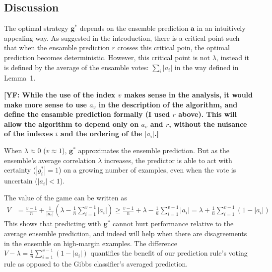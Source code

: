 \documentclass{article}[12pt]
\newcommand{\yoav}[1]{{\bf [YF: #1]}}
\theoremstyle{named}
\newcommand{\va}{\mathbf{a}}
\newcommand{\vg}{\mathbf{g}}    %
\newcommand{\vp}{\mathbf{p}}
\newcommand{\abs}[1]{\left| #1 \right|}
\newcommand{\lrp}[1]{\left(#1\right)}
\begin{document}


\subsection{Discussion}
\label{sec:1gamediscuss}

The optimal strategy $\vg^*$ depends on the ensemble prediction $\va$
in an intuitively appealing way. As suggested in the introduction,
there is a critical point such that when the ensamble prediction $r$
crosses this critical poin, the optimal prediction becomes
deterministic. However, this critical point is not $\lambda$, instead
it is defined by the average of the ensamble votes: $\sum_i |a_i|$ in
the way defined in Lemma~1.

\yoav{While the use of the index $v$ makes sense in the analysis, it
  would make more sense to use $a_v$ in the description of the
  algorithm, and define the ensamble prediction formally (I used $r$
  above). This will allow the algorithm to depend only on $a_v$ and
  $r$, without the nuisance of the indexes $i$ and the ordering of the
$|a_i|$.}

When $\lambda \approx 0$ ($v \approx 1$), $\vg^*$ approximates the ensemble prediction.  
But as the ensemble's average correlation $\lambda$ increases, 
the predictor is able to act with certainty ($\abs{g_i^*} = 1$) 
on a growing number of examples, 
even when the vote is uncertain ($\abs{a_i} < 1$). 

The value of the game can be written as 
\begin{align}
\label{valtbound}
V &= \frac{v-1}{n} + \frac{1}{\abs{a_v}} \lrp{ \lambda - \frac{1}{n} \sum_{i=1}^{v-1} \abs{a_i} } 
\geq \frac{v-1}{n} + \lambda - \frac{1}{n} \sum_{i=1}^{v-1} \abs{a_i}
= \lambda + \frac{1}{n} \sum_{i=1}^{v-1} \lrp{1 - \abs{a_i}}
\end{align}
This shows that predicting with $\vg^*$ cannot hurt performance relative to the average ensemble prediction, 
and indeed will help when there are disagreements in the ensemble on high-margin examples. 
The difference $V - \lambda = \frac{1}{n} \sum_{i=1}^{v-1} \lrp{1 - \abs{a_i}}$ 
quantifies the benefit of our prediction rule's voting rule as opposed to the Gibbs classifier's averaged prediction. 
\end{document}
